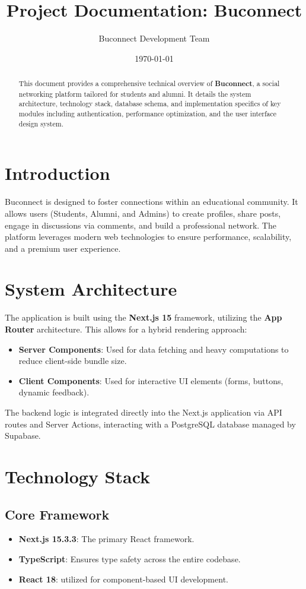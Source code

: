 \documentclass{article}
\title{\textbf{Project Documentation: Buconnect}}
\author{Buconnect Development Team}
\date{\today}
\begin{document}
\maketitle

\begin{abstract}
This document provides a comprehensive technical overview of \textbf{Buconnect}, a social networking platform tailored for students and alumni. It details the system architecture, technology stack, database schema, and implementation specifics of key modules including authentication, performance optimization, and the user interface design system.
\end{abstract}

\tableofcontents
\newpage

\section{Introduction}
Buconnect is designed to foster connections within an educational community. It allows users (Students, Alumni, and Admins) to create profiles, share posts, engage in discussions via comments, and build a professional network. The platform leverages modern web technologies to ensure performance, scalability, and a premium user experience.

\section{System Architecture}
The application is built using the \textbf{Next.js 15} framework, utilizing the \textbf{App Router} architecture. This allows for a hybrid rendering approach:
\begin{itemize}
    \item \textbf{Server Components}: Used for data fetching and heavy computations to reduce client-side bundle size.
    \item \textbf{Client Components}: Used for interactive UI elements (forms, buttons, dynamic feedback).
\end{itemize}
The backend logic is integrated directly into the Next.js application via API routes and Server Actions, interacting with a PostgreSQL database managed by Supabase.

\section{Technology Stack}

\subsection{Core Framework}
\begin{itemize}
    \item \textbf{Next.js 15.3.3}: The primary React framework.
    \item \textbf{TypeScript}: Ensures type safety across the entire codebase.
    \item \textbf{React 18}: utilized for component-based UI development.
\end{itemize}
\end{document}
